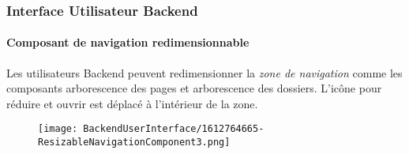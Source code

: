 %

\begin{frame}[fragile]
	\frametitle{Interface Utilisateur Backend}
	\framesubtitle{Composant de navigation redimensionnable}

	Les utilisateurs Backend peuvent redimensionner la \textit{zone de navigation} comme
	les composants arborescence des pages et arborescence des dossiers. L'icône pour réduire et ouvrir est
	déplacé à l'intérieur de la zone.

	\begin{figure}
		\texttt{[image: BackendUserInterface/1612764665-ResizableNavigationComponent3.png]}
	\end{figure}

\end{frame}

